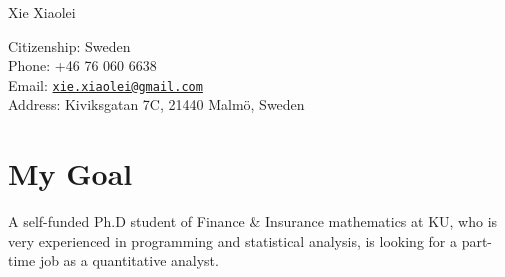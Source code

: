 \documentclass[10pt,letterpaper]{article}
\def\name{Xie Xiaolei}
\begin{document}
{\huge Xie Xiaolei}


\vspace{0.25in}

\begin{minipage}[t]{0.5\textwidth}
  Citizenship: Sweden \\
  Phone: +46 76 060 6638 \\
  Email: \href{mailto:xie.xiaolei@gmail.com}{\tt xie.xiaolei@gmail.com} \\
  Address: Kiviksgatan 7C, 21440 Malm\"{o}, Sweden
\end{minipage}

\section*{My Goal}
A self-funded Ph.D student of Finance \& Insurance mathematics
at KU, who is very experienced in programming and statistical analysis, is
looking for a part-time job as a quantitative analyst.
\end{document}
